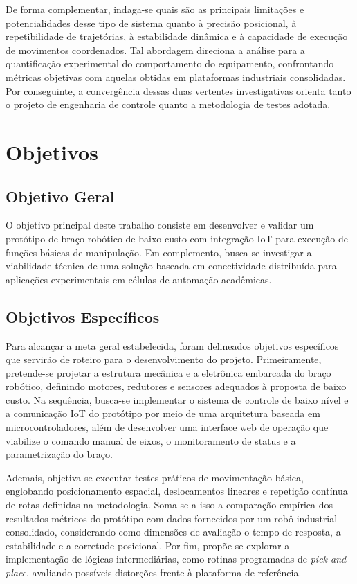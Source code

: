 De forma complementar, indaga-se quais são as principais limitações e potencialidades desse tipo de sistema quanto à precisão posicional, à repetibilidade de trajetórias, à estabilidade dinâmica e à capacidade de execução de movimentos coordenados. Tal abordagem direciona a análise para a quantificação experimental do comportamento do equipamento, confrontando métricas objetivas com aquelas obtidas em plataformas industriais consolidadas. Por conseguinte, a convergência dessas duas vertentes investigativas orienta tanto o projeto de engenharia de controle quanto a metodologia de testes adotada.

\section{Objetivos}

\subsection{Objetivo Geral}

O objetivo principal deste trabalho consiste em desenvolver e validar um protótipo de braço robótico de baixo custo com integração IoT para execução de funções básicas de manipulação. Em complemento, busca-se investigar a viabilidade técnica de uma solução baseada em conectividade distribuída para aplicações experimentais em células de automação acadêmicas.

\subsection{Objetivos Específicos}

Para alcançar a meta geral estabelecida, foram delineados objetivos específicos que servirão de roteiro para o desenvolvimento do projeto. Primeiramente, pretende-se projetar a estrutura mecânica e a eletrônica embarcada do braço robótico, definindo motores, redutores e sensores adequados à proposta de baixo custo. Na sequência, busca-se implementar o sistema de controle de baixo nível e a comunicação IoT do protótipo por meio de uma arquitetura baseada em microcontroladores, além de desenvolver uma interface web de operação que viabilize o comando manual de eixos, o monitoramento de status e a parametrização do braço.

Ademais, objetiva-se executar testes práticos de movimentação básica, englobando posicionamento espacial, deslocamentos lineares e repetição contínua de rotas definidas na metodologia. Soma-se a isso a comparação empírica dos resultados métricos do protótipo com dados fornecidos por um robô industrial consolidado, considerando como dimensões de avaliação o tempo de resposta, a estabilidade e a corretude posicional. Por fim, propõe-se explorar a implementação de lógicas intermediárias, como rotinas programadas de \textit{pick and place}, avaliando possíveis distorções frente à plataforma de referência.


